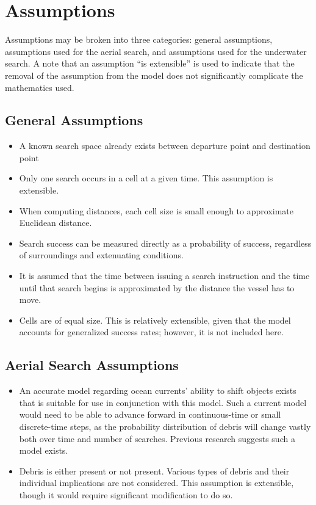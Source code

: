 \section{Assumptions}

Assumptions may be broken into three categories: general assumptions, assumptions used for the aerial search, and assumptions used for the underwater search. A note that an assumption ``is extensible'' is used to indicate that the removal of the assumption from the model does not significantly complicate the mathematics used.

\subsection{General Assumptions}

\begin{itemize}
\item A known search space already exists between departure point and destination point
\item Only one search occurs in a cell at a given time. This assumption is extensible.
\item When computing distances, each cell size is small enough to approximate Euclidean distance.
\item Search success can be measured directly as a probability of success, regardless of surroundings and extenuating conditions.
\item It is assumed that the time between issuing a search instruction and the time until that search begins is approximated by the distance the vessel has to move.
\item Cells are of equal size. This is relatively extensible, given that the model accounts for generalized success rates; however, it is not included here.
\end{itemize}

\subsection{Aerial Search Assumptions}

\begin{itemize}
\item An accurate model regarding ocean currents' ability to shift objects exists that is suitable for use in conjunction with this model. Such a current model would need to be able to advance forward in continuous-time or small discrete-time steps, as the probability distribution of debris will change vastly both over time and number of searches. Previous research suggests such a model exists.
\item Debris is either present or not present. Various types of debris and their individual implications are not considered. This assumption is extensible, though it would require significant modification to do so.
\end{itemize}

